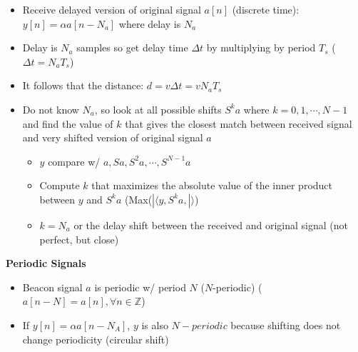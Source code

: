 \documentclass{article}\usepackage{amsmath,amssymb,amsthm,tikz,tkz-graph,color,chngpage,soul,hyperref,csquotes,graphicx,floatrow,framed,scrextend,mathtools,mathrsfs}\newcommand*{\QEDB}{\hfill\ensuremath{\square}}\newtheorem*{prop}{Proposition}\renewcommand{\theenumi}{\alph{enumi}}\usepackage[shortlabels]{enumitem}\usepackage[nobreak=true]{mdframed}\usetikzlibrary{matrix,calc}\MakeOuterQuote{"}\usepackage[margin=0.75in]{geometry} \newtheorem{theorem}{Theorem}\newcommand{\Z}{\mathbb Z}\newcommand{\R}{\mathbb R}\newcommand{\Q}{\mathbb Q}\newcommand{\N}{\mathbb N}\newcommand{\x}[1]{\textrm{#1}}\newcommand{\xs}[1]{\textrm{ #1 }}\newcommand{\pr}{\textrm{Pr}}
\newcommand{\inprod}[2]{\langle #1, #2\rangle}
\begin{document}
\begin{itemize}
    \item Receive delayed version of original signal $a[n]$ (discrete time): $y[n]=\alpha a[n-N_a]$ where delay is $N_a$
    \item Delay is $N_a$ samples so get delay time $\Delta t$ by multiplying by period $T_s$ ($\Delta t = N_a T_s$)
    \item It follows that the distance: $d = v\Delta t = v N_aT_s$
    \item Do not know $N_a$, so look at all possible shifts $S^ka$ where $k=0,1,\cdots,N-1$ and find the value of $k$ that gives the closest match between received signal and very shifted version of original signal $a$
    \begin{itemize}
        \item $y$ compare w/ $a, Sa, S^2a,\cdots, S^{N-1}a$
        \item Compute $k$ that maximizes the absolute value of the inner product between $y$ and $S^ka$ (Max($|\inprod{y, S^ka}|$)
        \item $k = N_a$ or the delay shift between the received and original signal (not perfect, but close)
    \end{itemize}
\end{itemize}
\textbf{Periodic Signals}
\begin{itemize}
    \item Beacon signal $a$ is periodic w/ period $N$ ($N$-periodic) ($a[n-N]=a[n], \forall n \in \Z$) 
    \item If $y[n]=\alpha a[n-N_A]$,  $y$ is also $N-periodic$ because shifting does not change periodicity (circular shift)
\end{itemize}
\end{document}
